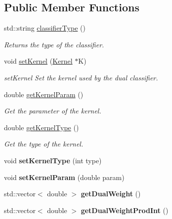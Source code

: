 \subsection*{Public Member Functions}
\begin{DoxyCompactItemize}
\item 
std\+::string \hyperlink{class_dual_classifier_af1217d4b44e417817a25157bb3f9b6d9}{classifier\+Type} ()
\begin{DoxyCompactList}\small\item\em Returns the type of the classifier. \end{DoxyCompactList}\item 
void \hyperlink{class_dual_classifier_a4f4cc830f9f9723592dc92957aec5d48}{set\+Kernel} (\hyperlink{class_kernel}{Kernel} $\ast$K)
\begin{DoxyCompactList}\small\item\em set\+Kernel Set the kernel used by the dual classifier. \end{DoxyCompactList}\item 
double \hyperlink{class_dual_classifier_ad5cc383587a3388bfc370879d76b8cf6}{get\+Kernel\+Param} ()
\begin{DoxyCompactList}\small\item\em Get the parameter of the kernel. \end{DoxyCompactList}\item 
double \hyperlink{class_dual_classifier_ae15bdcaa9b46e1084aa2df7170a0217f}{get\+Kernel\+Type} ()
\begin{DoxyCompactList}\small\item\em Get the type of the kernel. \end{DoxyCompactList}\item 
\mbox{\label{class_dual_classifier_abe138aa8f388a11475773155961911be}} 
void {\bfseries set\+Kernel\+Type} (int type)
\item 
\mbox{\label{class_dual_classifier_a1eaa47dfe556a9c0ecb05cd82324c337}} 
void {\bfseries set\+Kernel\+Param} (double param)
\item 
\mbox{\label{class_dual_classifier_a179729f872fe280d752089c571187fbf}} 
std\+::vector$<$ double $>$ {\bfseries get\+Dual\+Weight} ()
\item 
\mbox{\label{class_dual_classifier_a2780174d195acdfc2d3c9777c48e818c}} 
std\+::vector$<$ double $>$ {\bfseries get\+Dual\+Weight\+Prod\+Int} ()
\end{DoxyCompactItemize}
